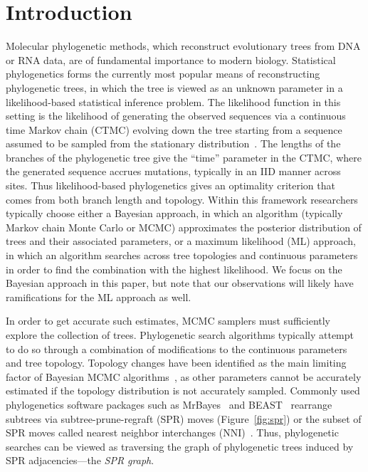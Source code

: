 \documentclass[11pt,onecolumn,conference]{IEEEtran}
\begin{document}
\pagebreak


\section{Introduction}
Molecular phylogenetic methods, which reconstruct evolutionary trees from DNA or RNA data, are of fundamental importance to modern biology.
Statistical phylogenetics forms the currently most popular means of reconstructing phylogenetic trees, in which the tree is viewed as an unknown parameter in a likelihood-based statistical inference problem.
The likelihood function in this setting is the likelihood of generating the observed sequences via a continuous time Markov chain (CTMC) evolving down the tree starting from a sequence assumed to be sampled from the stationary distribution~\cite{felsenstein1981evolutionary}.
The lengths of the branches of the phylogenetic tree give the ``time'' parameter in the CTMC, where the generated sequence accrues mutations, typically in an IID manner across sites.
Thus likelihood-based phylogenetics gives an optimality criterion that comes from both branch length and topology.
Within this framework researchers typically choose either a Bayesian approach, in which an algorithm (typically Markov chain Monte Carlo or MCMC) approximates the posterior distribution of trees and their associated parameters, or a maximum likelihood (ML) approach, in which an algorithm searches across tree topologies and continuous parameters in order to find the combination with the highest likelihood.
We focus on the Bayesian approach in this paper, but note that our observations will likely have ramifications for the ML approach as well.

In order to get accurate such estimates, MCMC samplers must sufficiently explore the collection of trees.
Phylogenetic search algorithms typically attempt to do so through a combination of modifications to the continuous parameters and tree topology.
Topology changes have been identified as the main limiting factor of Bayesian MCMC algorithms~\cite{lakner2008efficiency,hohna2012guided}, as other parameters cannot be accurately estimated if the topology distribution is not accurately sampled.
Commonly used phylogenetics software packages such as MrBayes~\cite{Ronquist2012-hi} and BEAST~\cite{bouckaert2014beast} rearrange subtrees via subtree-prune-regraft (SPR) moves (Figure~\ref{fig:spr}) or the subset of SPR moves called nearest neighbor interchanges (NNI)~\cite{robinson1971comparison}.
Thus, phylogenetic searches can be viewed as traversing the graph of phylogenetic trees induced by SPR adjacencies---the \emph{SPR graph}.
\end{document}
